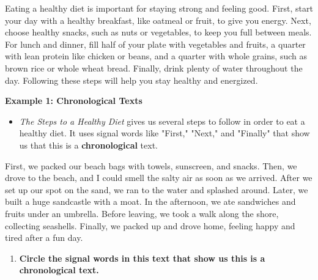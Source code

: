 \documentclass[12pt]{article}
\begin{document}
\begin{tcolorbox}[colframe=black!60, colback=white, 
coltitle=black, colbacktitle=black!15, fonttitle=\bfseries\Large, 
title=Text: The Steps to a Healthy Diet, halign title=center, left=10pt, right=10pt, top=10pt, bottom=15pt]

Eating a healthy diet is important for staying strong and feeling good. First, start your day with a healthy breakfast, like oatmeal or fruit, to give you energy. Next, choose healthy snacks, such as nuts or vegetables, to keep you full between meals. For lunch and dinner, fill half of your plate with vegetables and fruits, a quarter with lean protein like chicken or beans, and a quarter with whole grains, such as brown rice or whole wheat bread. Finally, drink plenty of water throughout the day. Following these steps will help you stay healthy and energized.

 
\end{tcolorbox}
\vspace{0.5cm}
\begin{tcolorbox}[colframe=black!60, colback=white, 
coltitle=black, colbacktitle=black!15, fonttitle=\bfseries\Large, 
title=Examples, halign title=center, left=10pt, right=10pt, top=10pt, bottom=15pt]

\textbf{Example 1: Chronological Texts}
\begin{itemize}

    \item \textit{The Steps to a Healthy Diet} gives us several steps to follow in order to eat a healthy diet. It uses signal words like "First," "Next," and "Finally" that show us that this is a \textbf{chronological} text.
    
\end{itemize}

\end{tcolorbox}

\vspace{0.5cm}


\begin{tcolorbox}[colframe=black!60, colback=white, 
coltitle=black, colbacktitle=black!15, fonttitle=\bfseries\Large, 
title=Guided Practice, halign title=center, left=10pt, right=10pt, top=10pt, bottom=15pt]


First, we packed our beach bags with towels, sunscreen, and snacks. Then, we drove to the beach, and I could smell the salty air as soon as we arrived. After we set up our spot on the sand, we ran to the water and splashed around. Later, we built a huge sandcastle with a moat. In the afternoon, we ate sandwiches and fruits under an umbrella. Before leaving, we took a walk along the shore, collecting seashells. Finally, we packed up and drove home, feeling happy and tired after a fun day.

\begin{enumerate}[itemsep=3em]
  \item  \textbf{Circle the signal words in this text that show us this is a \textbf{chronological } text.}
\end{enumerate}
\end{tcolorbox}
\end{document}
